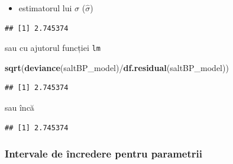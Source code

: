 \documentclass[]{article}
\newenvironment{Shaded}{\begin{snugshade}}{\end{snugshade}}
\newcommand{\KeywordTok}[1]{\textcolor[rgb]{0.13,0.29,0.53}{\textbf{{#1}}}}
\newcommand{\DecValTok}[1]{\textcolor[rgb]{0.00,0.00,0.81}{{#1}}}
\newcommand{\StringTok}[1]{\textcolor[rgb]{0.31,0.60,0.02}{{#1}}}
\newcommand{\CommentTok}[1]{\textcolor[rgb]{0.56,0.35,0.01}{\textit{{#1}}}}
\newcommand{\NormalTok}[1]{{#1}}
\providecommand{\tightlist}{%
  \setlength{\itemsep}{0pt}\setlength{\parskip}{0pt}}
\begin{document}
\begin{itemize}
\tightlist
\item
  estimatorul lui \(\sigma\) (\(\hat{\sigma}\))
\end{itemize}

\begin{Shaded}
\end{Shaded}

\begin{verbatim}
## [1] 2.745374
\end{verbatim}

sau cu ajutorul funcției \texttt{lm}

\begin{Shaded}
\begin{Highlighting}[]
\KeywordTok{sqrt}\NormalTok{(}\KeywordTok{deviance}\NormalTok{(saltBP_model)/}\KeywordTok{df.residual}\NormalTok{(saltBP_model))}
\end{Highlighting}
\end{Shaded}

\begin{verbatim}
## [1] 2.745374
\end{verbatim}

sau încă

\begin{Shaded}
\end{Shaded}

\begin{verbatim}
## [1] 2.745374
\end{verbatim}

\subsubsection{Intervale de încredere pentru
parametrii}\label{intervale-de-incredere-pentru-parametrii}
\end{document}
